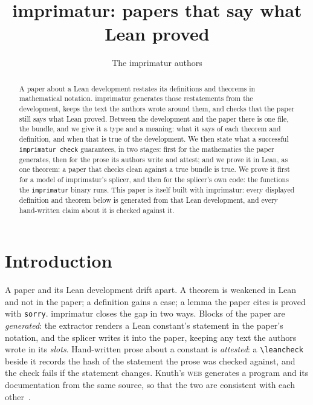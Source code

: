 \documentclass[acmsmall,screen,review,anonymous,nonacm]{acmart}
\title{imprimatur: papers that say what Lean proved}
\author{The imprimatur authors}
\begin{document}
\begin{abstract}
A paper about a Lean development restates its definitions and theorems in
mathematical notation. imprimatur generates those restatements from the
development, keeps the text the authors wrote around them, and checks that
the paper still says what Lean proved. Between the development and the
paper there is one file, the bundle, and we give it a type and a meaning:
what it says of each theorem and definition, and when that is true of the
development. We then state what a successful \texttt{imprimatur check}
guarantees, in two stages: first for the mathematics the paper generates,
then for the prose its authors write and attest; and we prove it in Lean,
as one theorem: a paper that checks clean against a true bundle is true. We
prove it first for a model of imprimatur's splicer, and then for the
splicer's own code: the functions the \texttt{imprimatur} binary runs. This paper is itself built with
imprimatur: every displayed definition and theorem below is generated from
that Lean development, and every hand-written claim about it is checked
against it.
\end{abstract}

\maketitle

\section{Introduction}\label{sec:intro}

A paper and its Lean development drift apart. A theorem is weakened in Lean
and not in the paper; a definition gains a case; a lemma the paper cites is
proved with \texttt{sorry}. imprimatur closes the gap in two ways. Blocks of
the paper are \emph{generated}: the extractor renders a Lean constant's
statement in the paper's notation, and the splicer writes it into the paper,
keeping any text the authors wrote in its \emph{slots}. Hand-written prose
about a constant is \emph{attested}: a \verb|\leancheck| beside it records
the hash of the statement the prose was checked against, and the check
fails if the statement changes. Knuth's \textsc{web} generates a program and its
documentation from the same source, so that the two are consistent with
each other~\cite{Knuth84}.
\end{document}

